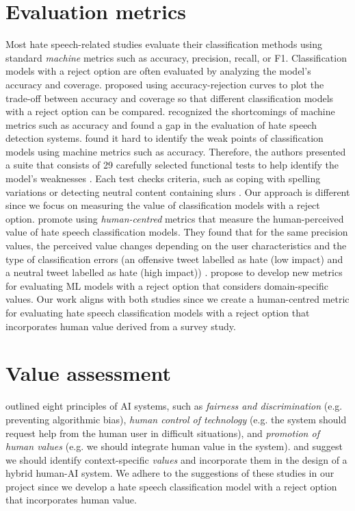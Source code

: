 \section{Evaluation metrics}
\label{sec:related-work-evaluation-metrics}
Most hate speech-related studies evaluate their classification methods using standard \textit{machine} metrics such as accuracy, precision, recall, or F1.
% 
Classification models with a reject option are often evaluated by analyzing the model's accuracy and coverage.
%
\citet{nadeem2009reject} proposed using accuracy-rejection curves to plot the trade-off between accuracy and coverage so that different classification models with a reject option can be compared.
%
\citet{rottger2020hatecheck, casati2021value, olteanu2017limits} recognized the shortcomings of machine metrics such as accuracy and found a gap in the evaluation of hate speech detection systems.
%
\citet{rottger2020hatecheck} found it hard to identify the weak points of classification models using machine metrics such as accuracy.
%
Therefore, the authors presented a suite that consists of 29 carefully selected functional tests to help identify the model's weaknesses \citep{rottger2020hatecheck}.
%
Each test checks criteria, such as coping with spelling variations or detecting neutral content containing slurs \citep{rottger2020hatecheck}.
%
Our approach is different since we focus on measuring the value of classification models with a reject option.
%
\citet{olteanu2017limits} promote using \textit{human-centred} metrics that measure the human-perceived value of hate speech classification models.
%
They found that for the same precision values, the perceived value changes depending on the user characteristics and the type of classification errors (an offensive tweet labelled as hate (low impact) and a neutral tweet labelled as hate (high impact)) \citep{olteanu2017limits}.
%
\citet{casati2021value} propose to develop new metrics for evaluating ML models with a reject option that considers domain-specific values.
%
Our work aligns with both studies since we create a human-centred metric for evaluating hate speech classification models with a reject option that incorporates human value derived from a survey study.


\section{Value assessment}
\label{sec:related-work-value-assessment}
\citet{fjeld2020principled} outlined eight principles of AI systems, such as \emph{fairness and discrimination} (e.g. preventing algorithmic bias), \emph{human control of technology} (e.g. the system should request help from the human user in difficult situations), and \emph{promotion of human values} (e.g. we should integrate human value in the system).
%
\citet{sayin2021science} and \citet{casati2021value} suggest we should identify context-specific \emph{values} and incorporate them in the design of a hybrid human-AI system.
%
We adhere to the suggestions of these studies in our project since we develop a hate speech classification model with a reject option that incorporates human value.
%


